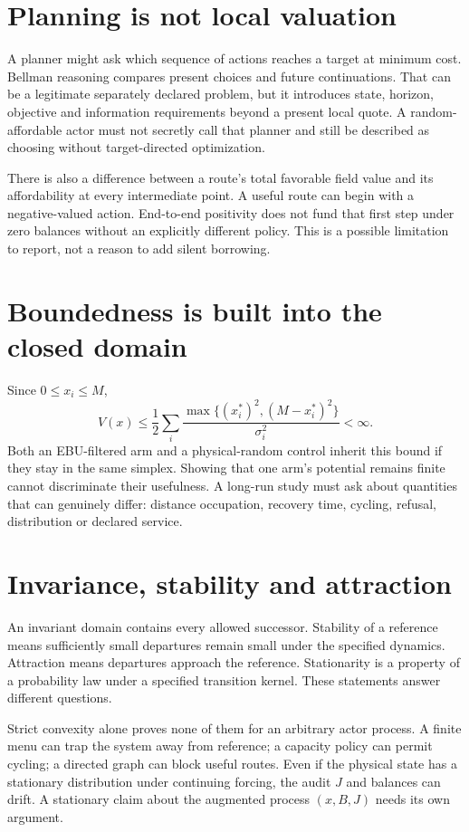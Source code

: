 \section{Planning is not local valuation}
A planner might ask which sequence of actions reaches a target at minimum
cost. Bellman reasoning compares present choices and future continuations.
That can be a legitimate separately declared problem, but it introduces
state, horizon, objective and information requirements beyond a present local
quote. A random-affordable actor must not secretly call that planner and
still be described as choosing without target-directed optimization.

There is also a difference between a route's total favorable field value
and its affordability at every intermediate point. A useful route can begin
with a negative-valued action. End-to-end positivity does not fund that first
step under zero balances without an explicitly different policy. This is a
possible limitation to report, not a reason to add silent borrowing.

\section{Boundedness is built into the closed domain}
Since $0\leq x_i\leq M$,
\begin{equation}
 V(x)\leq\frac12\sum_i
 \frac{\max\{(x_i^*)^2,(M-x_i^*)^2\}}{\sigma_i^2}<\infty.
\end{equation}
Both an EBU-filtered arm and a physical-random control inherit this bound
if they stay in the same simplex. Showing that one arm's potential remains
finite cannot discriminate their usefulness. A long-run study must ask
about quantities that can genuinely differ: distance occupation, recovery
time, cycling, refusal, distribution or declared service.

\section{Invariance, stability and attraction}
An invariant domain contains every allowed successor. Stability of a
reference means sufficiently small departures remain small under the
specified dynamics. Attraction means departures approach the reference.
Stationarity is a property of a probability law under a specified transition
kernel. These statements answer different questions.

Strict convexity alone proves none of them for an arbitrary actor process.
A finite menu can trap the system away from reference; a capacity policy
can permit cycling; a directed graph can block useful routes. Even if the
physical state has a stationary distribution under continuing forcing, the
audit $J$ and balances can drift. A stationary claim about the augmented
process $(x,B,J)$ needs its own argument.

